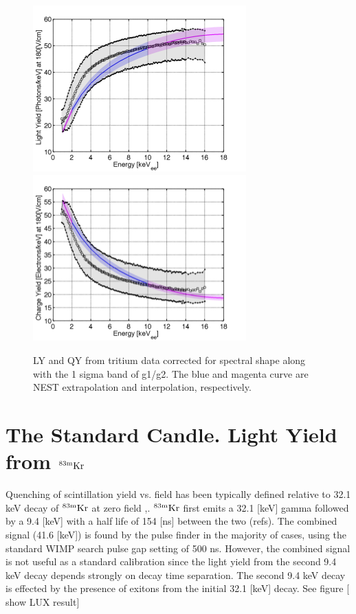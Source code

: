  \begin{figure}[h!]\centering
 \includegraphics[width=82mm]{Recombination_LY_QY/Figures/Iter1/LY_180__1sigBand_LY_QY_iter1.png}
 \includegraphics[width=82mm]{Recombination_LY_QY/Figures/Iter1/QY_180_1sigBand_.png}
\caption{LY and QY from tritium data corrected for spectral shape along with the 1 sigma band of g1/g2. The blue and magenta curve are NEST extrapolation and interpolation, respectively.}
\label{fig:LYQY_data}
\end{figure}


\newpage

\section{The Standard Candle. Light Yield from $\rm^{83m}Kr$}

Quenching of scintillation yield vs. field has been  typically defined relative to 32.1 keV decay of $\rm^{83m}Kr$ at zero field \cite{Aprile_LY},\cite{Baudis}. $\rm^{83m}Kr$ first emits a 32.1 [keV] gamma followed by a 9.4 [keV] with a half life of 154 [ns] between the two (refs). The combined signal (41.6 [keV]) is found by the pulse finder in the majority of cases, using the standard WIMP search pulse gap setting of 500 ns. However, the combined signal is not useful as a standard calibration since the light yield from the second 9.4 keV decay depends strongly on decay time separation. The second 9.4 keV decay is effected by the presence of exitons from the initial 32.1 [keV] decay. See figure [ show LUX result]

